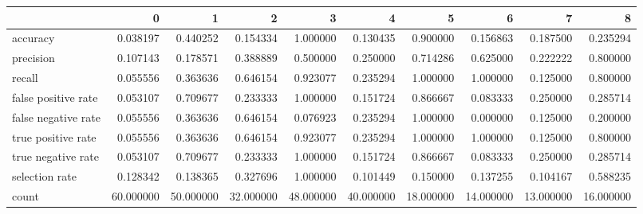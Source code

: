 \begin{tabular}{lrrrrrrrrr}
\toprule
{} &          0 &          1 &          2 &          3 &          4 &          5 &          6 &          7 &          8 \\
\midrule
accuracy            &   0.038197 &   0.440252 &   0.154334 &   1.000000 &   0.130435 &   0.900000 &   0.156863 &   0.187500 &   0.235294 \\
precision           &   0.107143 &   0.178571 &   0.388889 &   0.500000 &   0.250000 &   0.714286 &   0.625000 &   0.222222 &   0.800000 \\
recall              &   0.055556 &   0.363636 &   0.646154 &   0.923077 &   0.235294 &   1.000000 &   1.000000 &   0.125000 &   0.800000 \\
false positive rate &   0.053107 &   0.709677 &   0.233333 &   1.000000 &   0.151724 &   0.866667 &   0.083333 &   0.250000 &   0.285714 \\
false negative rate &   0.055556 &   0.363636 &   0.646154 &   0.076923 &   0.235294 &   1.000000 &   0.000000 &   0.125000 &   0.200000 \\
true positive rate  &   0.055556 &   0.363636 &   0.646154 &   0.923077 &   0.235294 &   1.000000 &   1.000000 &   0.125000 &   0.800000 \\
true negative rate  &   0.053107 &   0.709677 &   0.233333 &   1.000000 &   0.151724 &   0.866667 &   0.083333 &   0.250000 &   0.285714 \\
selection rate      &   0.128342 &   0.138365 &   0.327696 &   1.000000 &   0.101449 &   0.150000 &   0.137255 &   0.104167 &   0.588235 \\
count               &  60.000000 &  50.000000 &  32.000000 &  48.000000 &  40.000000 &  18.000000 &  14.000000 &  13.000000 &  16.000000 \\
\bottomrule
\end{tabular}
